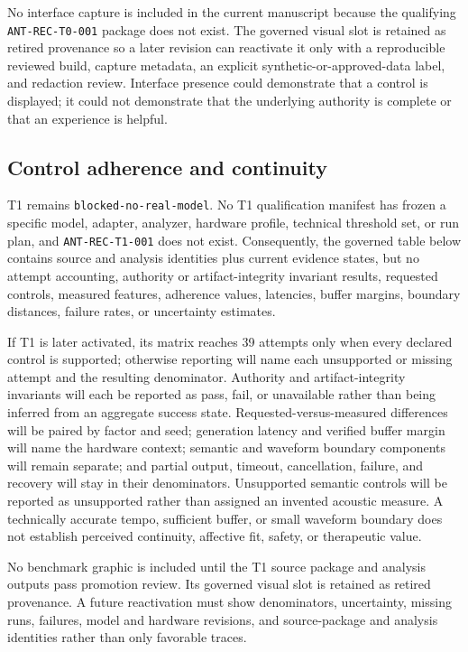 No interface capture is included in the current manuscript because the
qualifying \texttt{ANT-REC-T0-001} package does not exist. The governed visual
slot is retained as retired provenance so a later revision can reactivate it
only with a reproducible reviewed build, capture metadata, an explicit
synthetic-or-approved-data label, and redaction review. Interface presence
could demonstrate that a control is displayed; it could not demonstrate that
the underlying authority is complete or that an experience is helpful.

\subsection{Control adherence and continuity}
\label{sec:results-control-adherence}

T1 remains \texttt{blocked-no-real-model}. No T1 qualification manifest has
frozen a specific model, adapter, analyzer, hardware profile, technical
threshold set, or run plan, and \texttt{ANT-REC-T1-001} does not exist.
Consequently, the governed
table below contains source and analysis identities plus current evidence
states, but no attempt accounting, authority or artifact-integrity invariant
results, requested controls, measured features, adherence values, latencies,
buffer margins, boundary distances, failure rates, or uncertainty estimates.

\FloatBarrier

If T1 is later activated, its matrix reaches 39 attempts only when every
declared control is supported; otherwise reporting will name each unsupported
or missing attempt and the resulting denominator. Authority and artifact-integrity
invariants will each be reported as pass, fail, or unavailable rather than
being inferred from an aggregate success state. Requested-versus-measured
differences will be paired by factor and seed; generation latency and verified
buffer margin will name the hardware context; semantic and waveform boundary
components will remain separate; and partial output, timeout, cancellation,
failure, and recovery will stay in their denominators. Unsupported semantic
controls will be reported as unsupported rather than assigned an invented
acoustic measure. A technically accurate tempo, sufficient buffer, or small
waveform boundary does not establish perceived continuity, affective fit,
safety, or therapeutic value.

No benchmark graphic is included until the T1 source package and analysis
outputs pass promotion review. Its governed visual slot is retained as retired
provenance. A future reactivation must show denominators, uncertainty, missing
runs, failures, model and hardware revisions, and source-package and analysis
identities rather than only favorable traces.

